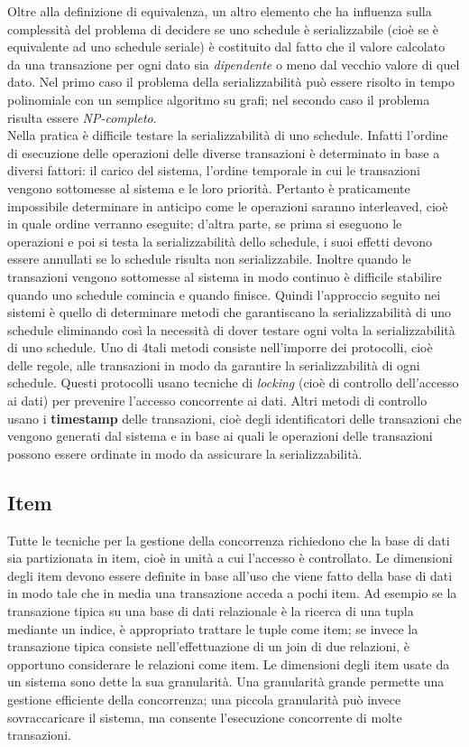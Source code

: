 Oltre alla definizione di equivalenza, un altro elemento che ha influenza sulla complessità del
problema di decidere se uno schedule è serializzabile (cioè se è equivalente ad uno schedule seriale)
è costituito dal fatto che il valore calcolato da una transazione per ogni dato sia \emph{dipendente} o meno
dal vecchio valore di quel dato. Nel primo caso il problema della serializzabilità può essere risolto
in tempo polinomiale con un semplice algoritmo su grafi; nel secondo caso il problema risulta
essere \emph{NP-completo}.\\
Nella pratica è difficile testare la serializzabilità di uno schedule. Infatti l'ordine di esecuzione delle
operazioni delle diverse transazioni è determinato in base a diversi fattori: il carico del sistema,
l'ordine temporale in cui le transazioni vengono sottomesse al sistema e le loro priorità. Pertanto è
praticamente impossibile determinare in anticipo come le operazioni saranno interleaved, cioè in
quale ordine verranno eseguite; d'altra parte, se prima si eseguono le operazioni e poi si testa la
serializzabilità dello schedule, i suoi effetti devono essere annullati se lo schedule risulta non
serializzabile. Inoltre quando le transazioni vengono sottomesse al sistema in modo continuo è
difficile stabilire quando uno schedule comincia e quando finisce. Quindi l'approccio seguito nei
sistemi è quello di determinare metodi che garantiscano la serializzabilità di uno schedule
eliminando così la necessità di dover testare ogni volta la serializzabilità di uno schedule. Uno di
4tali metodi consiste nell'imporre dei protocolli, cioè delle regole, alle transazioni in modo da
garantire la serializzabilità di ogni schedule. Questi protocolli usano tecniche di \emph{locking} (cioè di
controllo dell'accesso ai dati) per prevenire l'accesso concorrente ai dati. Altri metodi di controllo
usano i \textbf{timestamp} delle transazioni, cioè degli identificatori delle transazioni che vengono generati
dal sistema e in base ai quali le operazioni delle transazioni possono essere ordinate in modo da
assicurare la serializzabilità.

\subsection{Item}
Tutte le tecniche per la gestione della concorrenza richiedono che la base di dati sia partizionata in
item, cioè in unità a cui l'accesso è controllato. Le dimensioni degli item devono essere definite in
base all'uso che viene fatto della base di dati in modo tale che in media una transazione acceda a
pochi item. Ad esempio se la transazione tipica su una base di dati relazionale è la ricerca di una
tupla mediante un indice, è appropriato trattare le tuple come item; se invece la transazione tipica
consiste nell'effettuazione di un join di due relazioni, è opportuno considerare le relazioni come
item. Le dimensioni degli item usate da un sistema sono dette la sua granularità. Una granularità
grande permette una gestione efficiente della concorrenza; una piccola granularità può invece
sovraccaricare il sistema, ma consente l'esecuzione concorrente di molte transazioni.

